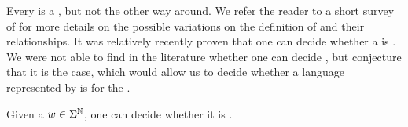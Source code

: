 \AP
Every  is a , but not the other way around. We refer
the reader to a short survey of \cite{ALSZ17} for more details on the possible
variations on the definition of  and their relationships.
It was relatively recently proven that one can decide whether a  is  \cite[Theorem 1]{DURAND13}. We were not
able to find in the literature whether one can decide , but conjecture that it is the case, which would allow us to
decide whether a language represented by  is
 for the .

\begin{conjecture}
  \label{morphic-uur:conj}
    Given a  $w \in \Sigma^{\mathbb{N}}$, one can decide
    whether it is .
\end{conjecture}
